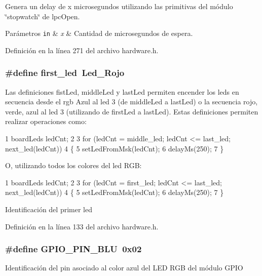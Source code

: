 Genera un delay de x microsegundos utilizando las primitivas del módulo \char`\"{}stopwatch\char`\"{} de lpc\+Open. 


\begin{DoxyParams}[1]{Parámetros}
\mbox{\tt in}  & {\em x} & Cantidad de microsegundos de espera. \\
\hline
\end{DoxyParams}


Definición en la línea 271 del archivo hardware.\+h.

\subsubsection[{\texorpdfstring{first\+\_\+led}{first_led}}]{\setlength{\rightskip}{0pt plus 5cm}\#define first\+\_\+led~{\bf Led\+\_\+\+Rojo}}\hypertarget{group__hardware_ga43a19ad1766c3719e591430d601496f7}{}\label{group__hardware_ga43a19ad1766c3719e591430d601496f7}


Las definiciones fist\+Led, middle\+Led y last\+Led permiten encender los leds en secuencia desde el rgb Azul al led 3 (de middle\+Led a last\+Led) o la secuencia rojo, verde, azul al led 3 (utilizando de first\+Led a last\+Led). Estas definiciones permiten realizar operaciones como\+: 


\begin{DoxyCode}
1 boardLeds ledCnt;
2 
3 for (ledCnt = middle\_led; ledCnt <= last\_led; next\_led(ledCnt))
4 \{
5   setLedFromMsk(ledCnt);
6   delayMs(250);
7 \}
\end{DoxyCode}


O, utilizando todos los colores del led R\+GB\+:


\begin{DoxyCode}
1 boardLeds ledCnt;
2 
3 for (ledCnt = first\_led; ledCnt <= last\_led; next\_led(ledCnt))
4 \{
5   setLedFromMsk(ledCnt);
6   delayMs(250);
7 \}
\end{DoxyCode}
Identificación del primer led 

Definición en la línea 133 del archivo hardware.\+h.

\subsubsection[{\texorpdfstring{G\+P\+I\+O\+\_\+\+P\+I\+N\+\_\+\+B\+LU}{GPIO_PIN_BLU}}]{\setlength{\rightskip}{0pt plus 5cm}\#define G\+P\+I\+O\+\_\+\+P\+I\+N\+\_\+\+B\+LU~0x02}\hypertarget{group__hardware_ga2aa9b3c113e9f52a2e04ff811b8ec518}{}\label{group__hardware_ga2aa9b3c113e9f52a2e04ff811b8ec518}
Identificación del pin asociado al color azul del L\+ED R\+GB del módulo G\+P\+IO 

